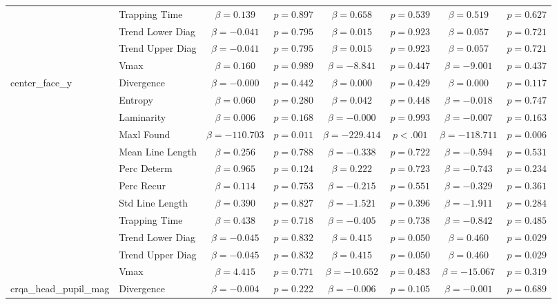 \begin{tabular}{llcc|cc|cc}
 & Trapping Time & $\beta = 0.139$ & $p = 0.897$ & $\beta = 0.658$ & $p = 0.539$ & $\beta = 0.519$ & $p = 0.627$ \\
 & Trend Lower Diag & $\beta = -0.041$ & $p = 0.795$ & $\beta = 0.015$ & $p = 0.923$ & $\beta = 0.057$ & $p = 0.721$ \\
 & Trend Upper Diag & $\beta = -0.041$ & $p = 0.795$ & $\beta = 0.015$ & $p = 0.923$ & $\beta = 0.057$ & $p = 0.721$ \\
 & Vmax & $\beta = 0.160$ & $p = 0.989$ & $\beta = -8.841$ & $p = 0.447$ & $\beta = -9.001$ & $p = 0.437$ \\
\midrule
\multirow{12}{*}{center_face_y} & Divergence & $\beta = -0.000$ & $p = 0.442$ & $\beta = 0.000$ & $p = 0.429$ & $\beta = 0.000$ & $p = 0.117$ \\
 & Entropy & $\beta = 0.060$ & $p = 0.280$ & $\beta = 0.042$ & $p = 0.448$ & $\beta = -0.018$ & $p = 0.747$ \\
 & Laminarity & $\beta = 0.006$ & $p = 0.168$ & $\beta = -0.000$ & $p = 0.993$ & $\beta = -0.007$ & $p = 0.163$ \\
 & Maxl Found & $\beta = -110.703$ & $p = 0.011$ & $\beta = -229.414$ & $p < .001$ & $\beta = -118.711$ & $p = 0.006$ \\
 & Mean Line Length & $\beta = 0.256$ & $p = 0.788$ & $\beta = -0.338$ & $p = 0.722$ & $\beta = -0.594$ & $p = 0.531$ \\
 & Perc Determ & $\beta = 0.965$ & $p = 0.124$ & $\beta = 0.222$ & $p = 0.723$ & $\beta = -0.743$ & $p = 0.234$ \\
 & Perc Recur & $\beta = 0.114$ & $p = 0.753$ & $\beta = -0.215$ & $p = 0.551$ & $\beta = -0.329$ & $p = 0.361$ \\
 & Std Line Length & $\beta = 0.390$ & $p = 0.827$ & $\beta = -1.521$ & $p = 0.396$ & $\beta = -1.911$ & $p = 0.284$ \\
 & Trapping Time & $\beta = 0.438$ & $p = 0.718$ & $\beta = -0.405$ & $p = 0.738$ & $\beta = -0.842$ & $p = 0.485$ \\
 & Trend Lower Diag & $\beta = -0.045$ & $p = 0.832$ & $\beta = 0.415$ & $p = 0.050$ & $\beta = 0.460$ & $p = 0.029$ \\
 & Trend Upper Diag & $\beta = -0.045$ & $p = 0.832$ & $\beta = 0.415$ & $p = 0.050$ & $\beta = 0.460$ & $p = 0.029$ \\
 & Vmax & $\beta = 4.415$ & $p = 0.771$ & $\beta = -10.652$ & $p = 0.483$ & $\beta = -15.067$ & $p = 0.319$ \\
\midrule
\multirow{12}{*}{crqa_head_pupil_mag} & Divergence & $\beta = -0.004$ & $p = 0.222$ & $\beta = -0.006$ & $p = 0.105$ & $\beta = -0.001$ & $p = 0.689$ \\

\end{tabular}
